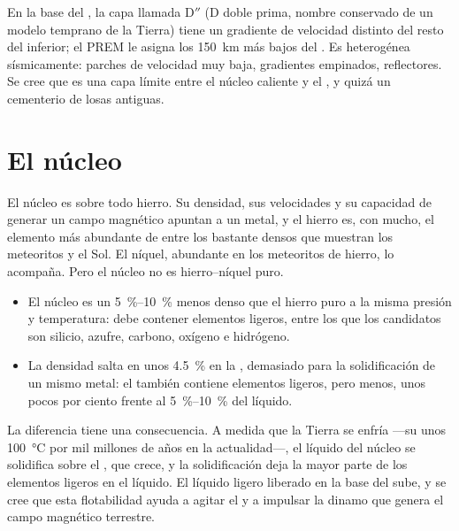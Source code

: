 En la base del , la capa llamada D$''$ (D doble prima, nombre conservado de un modelo temprano de la Tierra) tiene un gradiente de
velocidad distinto del resto del  inferior; el PREM le asigna los \qty{150}{km} más bajos del . Es heterogénea
sísmicamente: parches de velocidad muy baja, gradientes empinados, reflectores. Se cree que es una capa límite entre el núcleo
caliente y el , y quizá un cementerio de losas antiguas.

\section{El núcleo}

El núcleo es sobre todo hierro. Su densidad, sus velocidades y su capacidad de generar un campo magnético apuntan a un metal,
y el hierro es, con mucho, el elemento más abundante de entre los bastante densos que muestran los meteoritos y el Sol. El níquel,
abundante en los meteoritos de hierro, lo acompaña. Pero el núcleo no es hierro--níquel puro.
\begin{itemize}
  \item El núcleo es un \qtyrange{5}{10}{\percent} menos denso que el hierro puro a la misma presión y temperatura: debe contener
        elementos ligeros, entre los que los candidatos son silicio, azufre, carbono, oxígeno e hidrógeno.
  \item La densidad salta en unos \qty{4.5}{\percent} en la , demasiado para la solidificación de un
        mismo metal: el  también contiene elementos ligeros, pero menos, unos pocos por ciento frente al
        \qtyrange{5}{10}{\percent} del líquido.
\end{itemize}
La diferencia tiene una consecuencia. A medida que la Tierra se enfría ---su  unos \qty{100}{\degreeCelsius} por mil millones
de años en la actualidad---, el líquido del núcleo se solidifica sobre el , que crece, y
la solidificación deja la mayor parte de los elementos ligeros en el líquido. El líquido ligero liberado en la base del  sube, y se cree que esta flotabilidad ayuda a agitar el  y a impulsar la dinamo que genera el campo
magnético terrestre.

